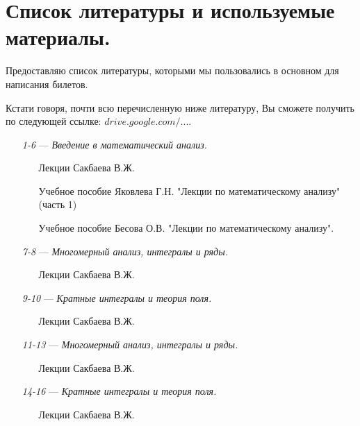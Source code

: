 \chapter{Список литературы и используемые материалы.}

Предоставляю список литературы, которыми мы пользовались в основном для написания билетов. 

Кстати говоря, почти всю перечисленную ниже литературу, Вы сможете получить по следующей ссылке: \href{https://drive.google.com/drive/u/0/folders/0BzuzEyNkpwYDcENXcV9jNWdwVlU}{$drive.google.com/...$}.

\begin{itemize}
\item[\textit{1-6}]
\; --- \: \textit{Введение в математический анализ.} 
\begin{itemize}
\item[\textbullet]
Лекции Сакбаева В.Ж.
\item[\textbullet]
Учебное пособие Яковлева Г.Н. "Лекции по математическому анализу" (часть 1)
\item[\textbullet]
Учебное пособие Бесова О.В. "Лекции по математическому анализу".
\end{itemize}

\item[\textit{7-8}] 
\; --- \: \textit{Многомерный анализ, интегралы и ряды.}
\begin{itemize}
\item[\textbullet]
Лекции Сакбаева В.Ж.
\end{itemize}

\item[\textit{9-10}] 
\; --- \: \textit{Кратные интегралы и теория поля.}
\begin{itemize}
\item[\textbullet]
Лекции Сакбаева В.Ж.
\end{itemize}

\item[\textit{11-13}] 
\; --- \: \textit{Многомерный анализ, интегралы и ряды.}
\begin{itemize}
\item[\textbullet]
Лекции Сакбаева В.Ж.
\end{itemize}

\item[\textit{14-16}] 
\; --- \: \textit{Кратные интегралы и теория поля.}
\begin{itemize}
\item[\textbullet]
Лекции Сакбаева В.Ж.
\end{itemize}


\end{itemize}

